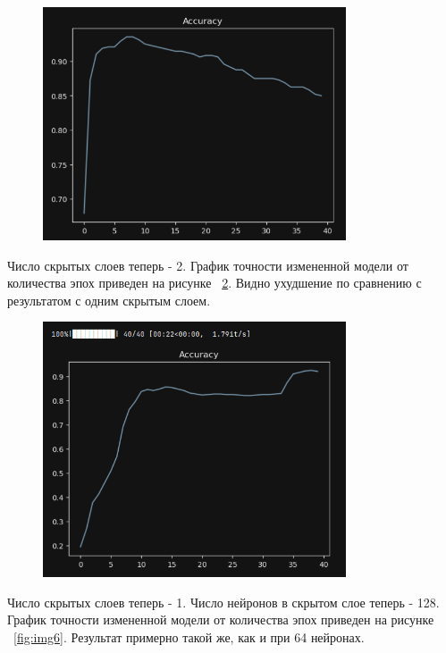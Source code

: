 \documentclass[a4paper, 14pt]{extarticle}
\begin{document}
\begin{figure}[H]
\centering
\includegraphics[width=0.8\textwidth]{images/res4.png}
\caption{}
\label{fig:img4}
\end{figure}

Число скрытых слоев теперь - 2. График точности измененной модели от количества эпох приведен на рисунке ~\ref{fig:img5}. Видно ухудшение по сравнению с результатом с одним скрытым слоем. 

\begin{figure}[H]
\centering
\includegraphics[width=0.8\textwidth]{images/res5.png}
\caption{}
\label{fig:img5}
\end{figure}

Число скрытых слоев теперь - 1. Число нейронов в скрытом слое теперь - 128. График точности измененной модели от количества эпох приведен на рисунке ~\ref{fig:img6}. Результат примерно такой же, как и при 64 нейронах. 
\end{document}

